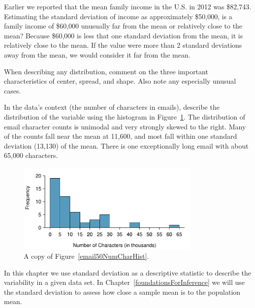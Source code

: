 \begin{example}{Earlier we reported that the mean family income in the U.S. in 2012 was \$82,743. Estimating the standard deviation of income as approximately \$50,000, is a family income of \$60,000 unusually far from the mean or relatively close to the mean?}
Because \$60,000 is less that one standard deviation from the mean, it is relatively close to the mean. If the value were more than 2 standard deviations away from the mean, we would consider it far from the mean.
\end{example}

When describing any distribution, comment on the three important characteristics of center, spread, and shape. Also note any especially unusual cases.

\begin{example}{In the data's context (the number of characters in emails), describe the distribution of the  variable using the histogram in Figure~\ref{email50NumCharHistCopy}.}
The distribution of email character counts is unimodal and very strongly skewed to the right. Many of the counts fall near the mean at 11,600, and most fall within one standard deviation (13,130) of the mean. There is one exceptionally long email with about 65,000 characters.

\begin{figure}
   \centering
   \includegraphics[width=0.8\textwidth]{ch_summarizing_data/figures/email50NumCharHist/email50NumCharHist}
   \caption{A copy of Figure~\ref{email50NumCharHist}.}
   \label{email50NumCharHistCopy}
\end{figure}

\end{example}

In this chapter we use standard deviation as a descriptive statistic to describe the variability in a given data set. In Chapter~\ref{foundationsForInference} we will use the standard deviation to assess how close a sample mean is to the population mean.


